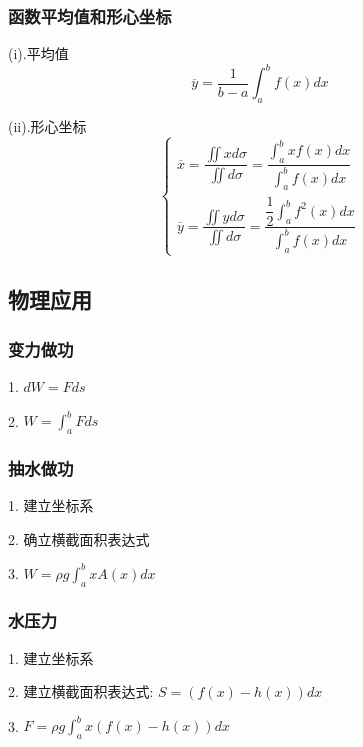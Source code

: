 \subsubsection{函数平均值和形心坐标}
\begin{theorem}[平均值和形心坐标]

	(i).平均值
	$$\overline{y}=\dfrac{1}{b-a}\int_{a}^{b}f(x)dx$$

	(ii).形心坐标
	$$\begin{cases}
		\overline{x}=\dfrac{\iint xd\sigma}{\iint d\sigma}=\dfrac{\int_{a}^{b}xf(x)dx}{\int_{a}^{b}f(x)dx} \\
		\overline{y}=\dfrac{\iint yd\sigma}{\iint d\sigma}=\dfrac{\dfrac{1}{2}\int_{a}^{b}f^{2}(x)dx}{\int_{a}^{b}f(x)dx}
	\end{cases}$$
\end{theorem}
\subsection{物理应用}
\subsubsection{变力做功}
\begin{definition}[变力做功]

	1. $dW = Fds$

	2. $W=\int_{a}^{b} Fds$
\end{definition}
\subsubsection{抽水做功}
\begin{definition}[抽水做功]

	1. 建立坐标系

	2. 确立横截面积表达式

	3. $W=\rho g\int_{a}^{b}xA(x)dx$
\end{definition}
\subsubsection{水压力}
\begin{definition}[水中受到的压力]

	1. 建立坐标系

	2. 建立横截面积表达式:  $S=(f(x)-h(x))dx$

	3. $F=\rho g\int_{a}^{b}x(f(x)-h(x))dx$
\end{definition}

